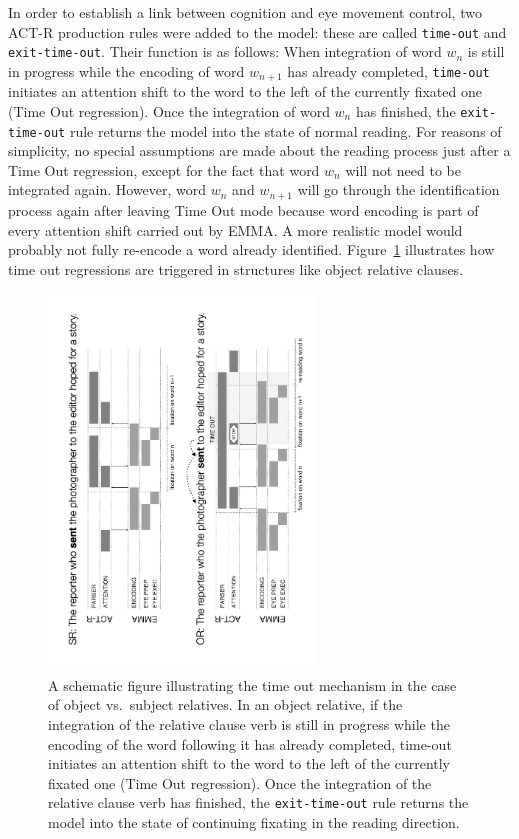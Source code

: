 \documentclass{cambridge7A}\usepackage[]{graphicx}\usepackage[]{color}
\begin{document}
In order to establish a link between cognition and eye movement control, two ACT-R production rules were added to the model: these are called \texttt{time-out} and  \texttt{exit-time-out}.  Their function is as follows: When integration of word $w_n$ is still in progress while the encoding of word $w_{n+1}$ has already completed, \texttt{time-out} initiates an attention shift to the word to the left of the currently fixated one  (Time Out regression).  Once the integration of word $w_n$ has finished, the \texttt{exit-time-out} rule returns the model into the state of normal reading.
For reasons of simplicity, no special assumptions are made about the reading process just after a Time Out regression, except for the fact that word $w_n$ will not need to be integrated again.  However, word $w_{n}$ and $w_{n+1}$ will go through the identification process again after leaving Time Out mode because word encoding is part of every attention shift carried out by EMMA.  A more realistic model would probably not fully re-encode a word already identified.  Figure~\ref{fig:timeout} illustrates how time out regressions are triggered in structures like object relative clauses.

\begin{figure}[!htbp]
\begin{center}
\includegraphics[height=10cm,angle=-90]{figures/emmatimeout}
\end{center}
\caption{A schematic figure illustrating the time out mechanism in the case of object vs.\ subject relatives. In an object relative, if the integration of the relative clause verb is still in progress while the encoding of the word following it has already completed, time-out initiates an attention shift to the word to the left of the currently fixated one (Time Out regression).  Once the integration of the relative clause verb has finished, the \texttt{exit-time-out} rule returns the model into the state of continuing fixating in the reading direction.}
\label{fig:timeout}
\end{figure}
\end{document}

